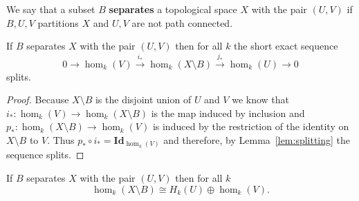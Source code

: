 
\begin{definition}[Separation]
  We say that a subset $B$ \textbf{separates} a topological space $X$ with the pair $(U, V)$ if $B, U, V$ partitions $X$ and $U, V$ are not path connected.
\end{definition}

\begin{lemma}\label{lem:separate_splits}
  If $B$ separates $X$ with the pair $(U, V)$ then for all $k$ the short exact sequence
  \[ 0\to \hom_k(V)\xrightarrow{i_*} \hom_k(X\setminus B)\xrightarrow{j_*} \hom_k(U)\to 0\]
  splits.
\end{lemma}
\begin{proof}
  Because $X\setminus B$ is the disjoint union of $U$ and $V$ we know that $i_* : \hom_k(V)\to \hom_k(X\setminus B)$ is the map induced by inclusion and $p_* : \hom_k(X\setminus B)\to \hom_k(V)$ is induced by the restriction of the identity on $X\setminus B$ to $V$.
  Thus $p_*\circ i_* = \mathbf{Id}_{\hom_k(V)}$ and therefore, by Lemma~\ref{lem:splitting} the sequence splits.%
\end{proof}

\begin{corollary}\label{cor:oplus_separates}
    If $B$ separates $X$ with the pair $(U, V)$ then for all $k$
    \[ \hom_k(X\setminus B) \cong H_k(U)\oplus \hom_k(V). \]
\end{corollary}

